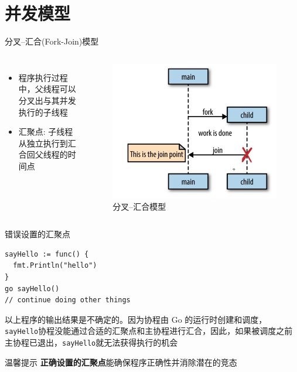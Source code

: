 \section{并发模型}
\begin{frame}{分叉--汇合(Fork-Join)模型}
  \begin{columns}
        \begin{itemize}
          \item 程序执行过程中，\alert{父线程}可以分叉出与其并发执行的\alert{子线程}
          \item \alert{汇聚点}: 子线程从独立执行到汇合回父线程的时间点
        \end{itemize}

      \begin{figure}
        \includegraphics[width=\textwidth]{images/fork-join.png}
        \caption{分叉--汇合模型}
      \end{figure}
  \end{columns}
\end{frame}

\begin{frame}[fragile]{错误设置的汇聚点}
\begin{lstlisting}[caption={不正确的汇聚点引发竞态},label={wrong-join}]
sayHello := func() {
  fmt.Println("hello")
}
go sayHello()
// continue doing other things
\end{lstlisting}

    \alert{以上程序的输出结果是不确定的}。因为协程由 Go 的运行时创建和调度，\texttt{sayHello}协程没能通过合适的汇聚点和主协程进行汇合，因此，如果被调度之前主协程已退出，\texttt{sayHello}就无法获得执行的机会

    \begin{exampleblock}{温馨提示}
        \textbf{正确设置的汇聚点}能确保程序正确性并消除潜在的\alert{竞态} 
    \end{exampleblock}
\end{frame}

